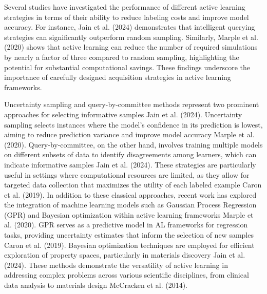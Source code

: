 Several studies have investigated the performance of different active learning strategies in terms of their ability to reduce labeling costs and improve model accuracy. For instance, Jain et al. (2024) demonstrates that intelligent querying strategies can significantly outperform random sampling. Similarly, Marple et al. (2020) shows that active learning can reduce the number of required simulations by nearly a factor of three compared to random sampling, highlighting the potential for substantial computational savings. These findings underscore the importance of carefully designed acquisition strategies in active learning frameworks.

Uncertainty sampling and query-by-committee methods represent two prominent approaches for selecting informative samples Jain et al. (2024). Uncertainty sampling selects instances where the model's confidence in its prediction is lowest, aiming to reduce prediction variance and improve model accuracy Marple et al. (2020). Query-by-committee, on the other hand, involves training multiple models on different subsets of data to identify disagreements among learners, which can indicate informative samples Jain et al. (2024). These strategies are particularly useful in settings where computational resources are limited, as they allow for targeted data collection that maximizes the utility of each labeled example Caron et al. (2019). In addition to these classical approaches, recent work has explored the integration of machine learning models such as Gaussian Process Regression (GPR) and Bayesian optimization within active learning frameworks Marple et al. (2020). GPR serves as a predictive model in AL frameworks for regression tasks, providing uncertainty estimates that inform the selection of new samples Caron et al. (2019). Bayesian optimization techniques are employed for efficient exploration of property spaces, particularly in materials discovery Jain et al. (2024). These methods demonstrate the versatility of active learning in addressing complex problems across various scientific disciplines, from clinical data analysis to materials design McCracken et al. (2014).

